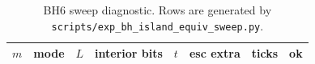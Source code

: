 \begin{table}[t]
\centering
\scriptsize
\setlength{\tabcolsep}{6pt}
\renewcommand{\arraystretch}{1.15}
\begin{tabular}{r l r r r r r r}
\toprule
$m$ & mode & $L$ & interior bits & $t$ & esc extra & ticks & ok \\
\midrule
%
\end{tabular}
\caption{BH6 sweep diagnostic. Rows are generated by \texttt{scripts/exp\_bh\_island\_equiv\_sweep.py}.}
\label{tab:bh_island_equiv_sweep}
\end{table}

%
